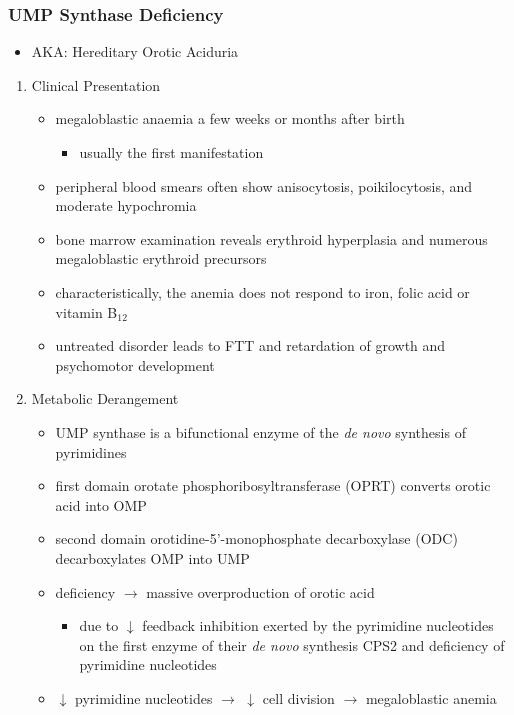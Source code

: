 \documentclass{scrartcl}
\begin{document}
\subsubsection{UMP Synthase Deficiency}
\label{sec:orgaf9a311}
\begin{itemize}
\item AKA: Hereditary Orotic Aciduria
\end{itemize}
\begin{enumerate}
\item Clinical Presentation
\label{sec:org66ae55d}
\begin{itemize}
\item megaloblastic anaemia a few weeks or months after birth
\begin{itemize}
\item usually the first manifestation
\end{itemize}
\item peripheral blood smears often show anisocytosis, poikilocytosis, and
moderate hypochromia
\item bone marrow examination reveals erythroid hyperplasia and numerous
megaloblastic erythroid precursors
\item characteristically, the anemia does not respond to iron, folic acid
or vitamin B\(_{\text{12}}\)
\item untreated disorder leads to FTT and retardation of growth and
psychomotor development
\end{itemize}

\item Metabolic Derangement
\label{sec:org850dde0}
\begin{itemize}
\item UMP synthase is a bifunctional enzyme of the \emph{de novo} synthesis of
pyrimidines
\item first domain orotate phosphoribosyltransferase (OPRT) converts
orotic acid into OMP
\item second domain orotidine-5’-monophosphate decarboxylase (ODC)
decarboxylates OMP into UMP
\end{itemize}
\begin{itemize}
\item deficiency \(\to\) massive overproduction of orotic acid
\begin{itemize}
\item due to \(\downarrow\) feedback inhibition exerted by the pyrimidine
nucleotides on the first enzyme of their \emph{de novo} synthesis CPS2
and deficiency of pyrimidine nucleotides
\end{itemize}
\item \(\downarrow\) pyrimidine nucleotides \(\to\) \(\downarrow\) cell division \(\to\)
megaloblastic anemia
\end{itemize}


\end{enumerate}
\end{document}

